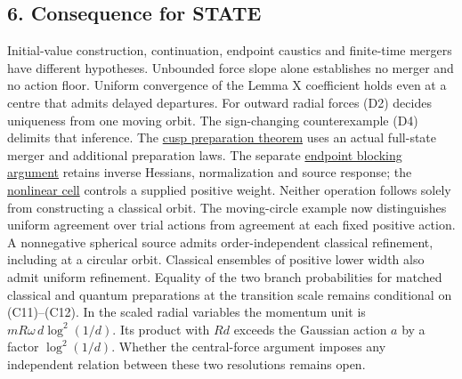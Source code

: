 \documentclass[11pt,a4paper]{article}
\begin{document}
\subsection{6. Consequence for STATE}\label{consequence-for-state}

Initial-value construction, continuation, endpoint caustics and
finite-time mergers have different hypotheses. Unbounded force slope
alone establishes no merger and no action floor. Uniform convergence of
the Lemma X coefficient holds even at a centre that admits delayed
departures. For outward radial forces (D2) decides uniqueness from one
moving orbit. The sign-changing counterexample (D4) delimits that
inference. The \href{newton-cusp-preparation-floor.md}{cusp preparation
theorem} uses an actual full-state merger and additional preparation
laws. The separate \href{balaban-newton-time-blocking.md}{endpoint
blocking argument} retains inverse Hessians, normalization and source
response; the \href{newton-nonlinear-time-cell.md}{nonlinear cell}
controls a supplied positive weight. Neither operation follows solely
from constructing a classical orbit. The moving-circle example now
distinguishes uniform agreement over trial actions from agreement at
each fixed positive action. A nonnegative spherical source admits
order-independent classical refinement, including at a circular orbit.
Classical ensembles of positive lower width also admit uniform
refinement. Equality of the two branch probabilities for matched
classical and quantum preparations at the transition scale remains
conditional on (C11)--(C12). In the scaled radial variables the momentum
unit is \(mR\omega\,d\log^2(1/d)\). Its product with \(Rd\) exceeds the
Gaussian action \(a\) by a factor \(\log^2(1/d)\). Whether the
central-force argument imposes any independent relation between these
two resolutions remains open.
\end{document}
